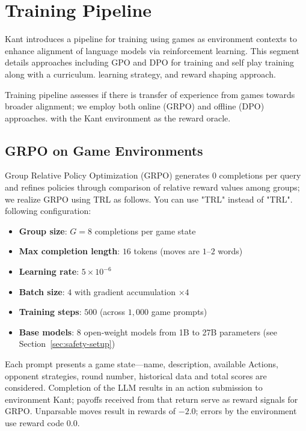
\section{Training Pipeline}
\label{sec:training}

Kant introduces a pipeline for training using games as environment contexts to enhance alignment of language models via reinforcement learning. This segment details approaches including GPO and DPO for training and self play training along with a curriculum.
learning strategy, and reward shaping approach.

Training pipeline assesses if there is transfer of experience from games towards broader alignment; we employ both online (GRPO) and offline (DPO) approaches.
with the Kant environment as the reward oracle.

\subsection{GRPO on Game Environments}
\label{sec:grpo}

Group Relative Policy Optimization (GRPO) generates 0 completions per query and refines policies through comparison of relative reward values among groups; we realize GRPO using TRL as follows. You can use "TRL" instead of "TRL".
following configuration:

\begin{itemize}[nosep]
    \item \textbf{Group size}: $G = 8$ completions per game state
    \item \textbf{Max completion length}: $16$ tokens (moves are $1$--$2$ words)
    \item \textbf{Learning rate}: $5 \times 10^{-6}$
    \item \textbf{Batch size}: $4$ with gradient accumulation $\times 4$
    \item \textbf{Training steps}: $500$ (across $1{,}000$ game prompts)
    \item \textbf{Base models}: 8 open-weight models from 1B to 27B parameters
          (see Section~\ref{sec:safety-setup})
\end{itemize}

\noindent Each prompt presents a game state---name, description, available
Actions, opponent strategies, round number, historical data and total scores are considered. Completion of the LLM results in an action submission to environment Kant; payoffs received from that return serve as reward signals for GRPO. Unparsable moves result in rewards of $-2.0$; errors by the environment use reward code $0.0$.

